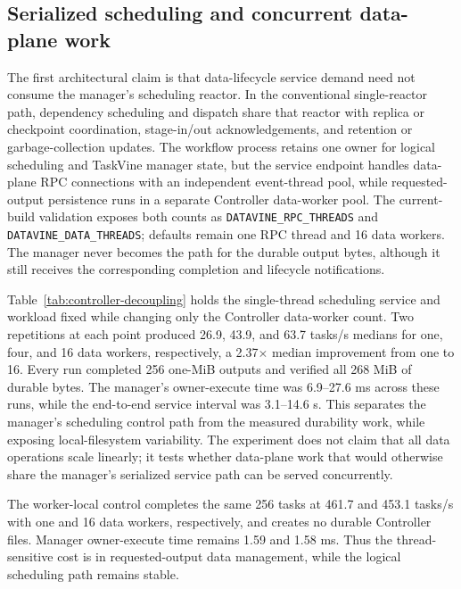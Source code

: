 \subsection{Serialized scheduling and concurrent data-plane work}
The first architectural claim is that data-lifecycle service demand need not
consume the manager's scheduling reactor. In the conventional single-reactor
path, dependency scheduling and dispatch share that reactor with replica or
checkpoint coordination, stage-in/out acknowledgements, and retention or
garbage-collection updates. The workflow process retains one owner for
logical scheduling and TaskVine manager state, but the service endpoint handles
data-plane RPC connections with an independent event-thread pool, while
requested-output persistence runs in a separate Controller data-worker pool.
The current-build validation exposes both counts as
\texttt{DATAVINE\_RPC\_THREADS} and \texttt{DATAVINE\_DATA\_THREADS}; defaults
remain one RPC thread and 16 data workers. The manager never becomes the path
for the durable output bytes, although it still receives the corresponding
completion and lifecycle notifications.

Table~\ref{tab:controller-decoupling} holds the single-thread scheduling
service and workload fixed while changing only the Controller data-worker
count. Two repetitions at each point produced 26.9, 43.9, and 63.7 tasks/s
medians for one, four, and 16 data workers, respectively, a 2.37$\times$
median improvement from one to 16. Every run completed 256 one-MiB outputs
and verified all 268 MiB of durable bytes. The manager's owner-execute time
was 6.9--27.6 ms across these runs, while the end-to-end service interval was
3.1--14.6 s. This separates the manager's scheduling control path from the
measured durability work, while exposing local-filesystem variability. The
experiment does not claim that all data operations scale linearly; it tests
whether data-plane work that would otherwise share the manager's serialized
service path can be served concurrently.



The worker-local control completes the same 256 tasks at 461.7 and 453.1
tasks/s with one and 16 data workers, respectively, and creates no durable
Controller files. Manager owner-execute time remains 1.59 and 1.58 ms. Thus
the thread-sensitive cost is in requested-output data management, while the
logical scheduling path remains stable.

